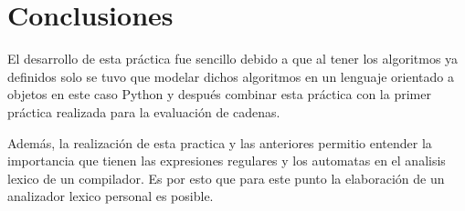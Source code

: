 \documentclass[titlepage]{article}
\begin{document}
\section{Conclusiones}
    El desarrollo de esta práctica fue sencillo debido a que al tener los algoritmos ya definidos \cite{compis} solo se tuvo que modelar dichos algoritmos en un lenguaje orientado a objetos en este caso Python y después combinar esta práctica con la primer práctica realizada para la evaluación de cadenas. 
    
    Además, la realización de esta practica y las anteriores permitio entender la importancia que tienen las expresiones regulares y los automatas en el analisis lexico de un compilador. Es por esto que para este punto la elaboración de un analizador lexico personal es posible.
     
    
\end{document}
